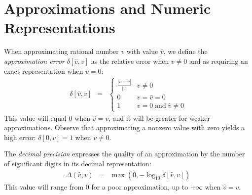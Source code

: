 \documentclass{easychair}
\newcommand{\approximate}[1]{\hat{#1}}
\newcommand{\approxv}{\approximate{v}}
\newcommand{\aerror}{\delta}
\newcommand{\digitprecision}{\Delta}
\begin{document}
\section{Approximations and Numeric Representations}
\label{sect:background:numbers}

When approximating rational number $v$ with value $\approxv$, we
define the \emph{approximation error} $\aerror[\approxv, v]$
as the relative error when $v \not = 0$ and as requiring an exact representation when $v = 0$:
\begin{eqnarray}
\aerror[\approxv, v] & = & \left\{ \begin{array}{ll}
  \frac{|\approxv - v|}{|v|}  & v \not = 0\\
  0 & v  = \approxv = 0\\
  1 & v = 0 \; \textrm{and} \; \approxv \not = 0
  \end{array} \right. \label{eqn:approx:error}
\end{eqnarray}
This value will equal 0 when $\approxv=v$, and it will be greater for weaker approximations.
Observe that approximating a nonzero value with zero yields a high error:  $\aerror[0, v] = 1$ when $v\not=0$.

The \emph{decimal precision} expresses the quality of an approximation by the number of significant digits in its decimal representation:
\begin{eqnarray}
\digitprecision(\approxv, v) & = & \max(0, -\log_{10} \aerror[\approxv, v]) \label{eqn:digitprecision} 
\end{eqnarray}
This value will range from $0$ for a poor approximation, up to $+\infty$ when $\approxv=v$.
\end{document}
